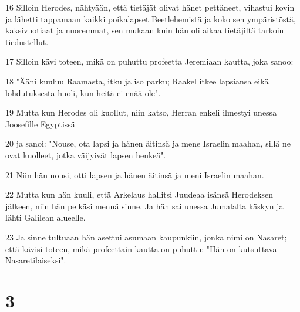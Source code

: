 \par 16 Silloin Herodes, nähtyään, että tietäjät olivat hänet pettäneet, vihastui kovin ja lähetti tappamaan kaikki poikalapset Beetlehemistä ja koko sen ympäristöstä, kaksivuotiaat ja nuoremmat, sen mukaan kuin hän oli aikaa tietäjiltä tarkoin tiedustellut.
\par 17 Silloin kävi toteen, mikä on puhuttu profeetta Jeremiaan kautta, joka sanoo:
\par 18 "Ääni kuuluu Raamasta, itku ja iso parku; Raakel itkee lapsiansa eikä lohdutuksesta huoli, kun heitä ei enää ole".
\par 19 Mutta kun Herodes oli kuollut, niin katso, Herran enkeli ilmestyi unessa Joosefille Egyptissä
\par 20 ja sanoi: "Nouse, ota lapsi ja hänen äitinsä ja mene Israelin maahan, sillä ne ovat kuolleet, jotka väijyivät lapsen henkeä".
\par 21 Niin hän nousi, otti lapsen ja hänen äitinsä ja meni Israelin maahan.
\par 22 Mutta kun hän kuuli, että Arkelaus hallitsi Juudeaa isänsä Herodeksen jälkeen, niin hän pelkäsi mennä sinne. Ja hän sai unessa Jumalalta käskyn ja lähti Galilean alueelle.
\par 23 Ja sinne tultuaan hän asettui asumaan kaupunkiin, jonka nimi on Nasaret; että kävisi toteen, mikä profeettain kautta on puhuttu: "Hän on kutsuttava Nasaretilaiseksi".

\chapter{3}

